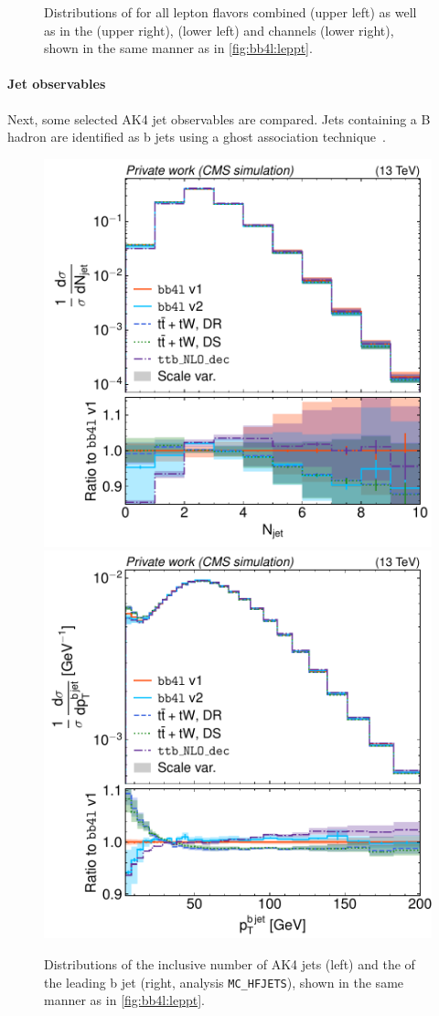\begin{figure}[tp]
    \caption{Distributions of \mll for all lepton flavors combined (upper left) as well as in the \emu (upper right), \ee (lower left) and \mumu channels (lower right), shown in the same manner as in \cref{fig:bb4l:leppt}.}
    \label{fig:bb4l:mll}
\end{figure}

\paragraph{Jet observables} Next, some selected AK4 jet observables are compared. 
Jets containing a B hadron are identified as b jets using a ghost association technique~\cite{Cacciari:2007fd,Cacciari:2008gn}. 

\begin{figure}[tp]
    \centering
    \includegraphics[width=0.49 \textwidth]{figures/bb4l/generators/MC_TTBAR_DILEP_SPINDENSITY_njet.pdf}
    \hfill
    \includegraphics[width=0.49 \textwidth]{figures/bb4l/generators/MC_HFJETS_ptBJetLead.pdf}
    \caption{Distributions of the inclusive number of AK4 jets (left) and the \pt of the leading b jet (right, \rivet analysis \texttt{MC\_HFJETS}), shown in the same manner as in \cref{fig:bb4l:leppt}.}
    \label{fig:bb4l:jets1}
\end{figure}

